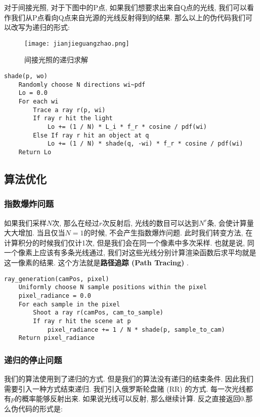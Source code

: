 对于间接光照, 对于下图中的P点, 如果我们想要求出来自Q点的光线, 我们可以看作我们从P点看向Q点来自光源的光线反射得到的结果. 那么以上的伪代码我们可以改写为递归的形式: 


\begin{figure}[H]
	\centering
	\texttt{[image: jianjieguangzhao.png]}
	\caption{间接光照的递归求解}
	\label{fig:jjgz}
\end{figure}

\begin{lstlisting}[caption=渲染函数积分项的递归求解伪代码]
shade(p, wo)
	Randomly choose N directions wi~pdf
	Lo = 0.0
	For each wi
		Trace a ray r(p, wi)
		If ray r hit the light
			Lo += (1 / N) * L_i * f_r * cosine / pdf(wi)
		Else If ray r hit an object at q
			Lo += (1 / N) * shade(q, -wi) * f_r * cosine / pdf(wi)
	Return Lo
\end{lstlisting}

\subsection{算法优化}

\subsubsection{指数爆炸问题}

如果我们采样$N$次, 那么在经过$r$次反射后, 光线的数目可以达到$N^r$条, 会使计算量大大增加. 当且仅当$N=1$的时候, 不会产生指数爆炸问题. 此时我们转变方法, 在计算积分的时候我们仅计1次, 但是我们会在同一个像素中多次采样. 也就是说, 同一个像素上应该有多条光线通过, 我们对这些光线分别计算渲染函数后求平均就是这一像素的结果. 这个方法就是\textbf{路径追踪 (Path Tracing) }. 

\begin{lstlisting}[caption=渲染函数解决指数爆炸伪代码]
ray_generation(camPos, pixel)
	Uniformly choose N sample positions within the pixel
	pixel_radiance = 0.0
	For each sample in the pixel
		Shoot a ray r(camPos, cam_to_sample)
		If ray r hit the scene at p
			pixel_radiance += 1 / N * shade(p, sample_to_cam)
	Return pixel_radiance
\end{lstlisting}

\subsubsection{递归的停止问题}
我们的算法使用到了递归的方式. 但是我们的算法没有递归的结束条件. 因此我们需要引入一种方式结束递归. 我们引入俄罗斯轮盘赌 (RR) 的方式. 每一次光线都有$p$的概率能够反射出来. 如果说光线可以反射, 那么继续计算. 反之直接返回0.那么伪代码的形式是: 

